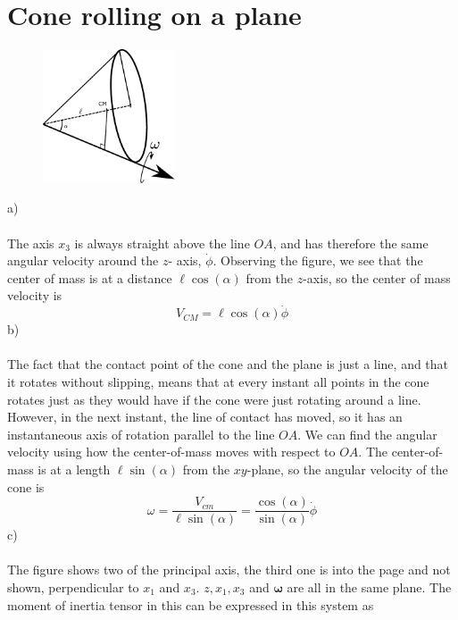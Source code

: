 \documentclass{article}
\begin{document}
    \section{Cone rolling on a plane}
        \begin{figure}
            \includegraphics[width=0.35\textwidth]{figures/exercise_7_3_cone2.pdf}
        \end{figure}
        a) \\ \\
        The axis $x_3$ is always straight above the line $OA$, and has therefore the same angular velocity around the $z$- axis, $\dot \phi$. Observing the figure, we see that the center of mass is at a distance $\ell \cos(\alpha)$ from the $z$-axis, so the center of mass velocity is
        \begin{equation*}
            V_{CM} = \ell \cos(\alpha) \dot \phi
        \end{equation*}
        b) \\ \\
        The fact that the contact point of the cone and the plane is just a line, and that it rotates without slipping, means that at every instant all points in the cone rotates just as they would have if the cone were just rotating around a line. However, in the next instant, the line of contact has moved, so it has an instantaneous axis of rotation parallel to the line $OA$. We can find the angular velocity using how the center-of-mass moves with respect to $OA$. The  center-of-mass is at a length $\ell \sin(\alpha)$ from the $xy$-plane, so the angular velocity of the cone is        
        \begin{equation*}
            \omega = \frac{V_{cm}}{\ell \sin(\alpha)} = \frac{\cos(\alpha)}{\sin(\alpha)} \dot \phi
        \end{equation*}
        c) \\ \\
        The figure shows two of the principal axis, the third one is into the page and not shown, perpendicular to $x_1$ and $x_3$. $z, x_1, x_3$ and $\boldsymbol{\omega}$ are all in the same plane. The moment of inertia tensor in this can be expressed in this system as 
\end{document}
